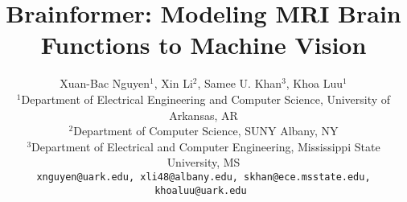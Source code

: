 \documentclass[10pt,twocolumn,letterpaper]{article}
\title{Brainformer: Modeling MRI Brain Functions to Machine Vision}
\author{Xuan-Bac Nguyen$^1$, Xin Li$^2$, Samee U. Khan$^3$, Khoa Luu$^1$\\
$^1$Department of Electrical Engineering and Computer Science, University of Arkansas, AR\\
$^2$Department of Computer Science, SUNY Albany, NY \\
$^3$Department of Electrical and Computer Engineering, Mississippi State University, MS \\
\tt\small{xnguyen@uark.edu, xli48@albany.edu, skhan@ece.msstate.edu, khoaluu@uark.edu}
}
\begin{document}
\maketitle
    






{
    \small
    
    
}
\end{document}
